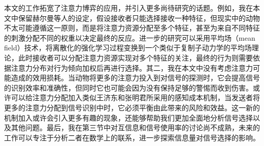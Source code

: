 \documentclass[12pt]{ctexart}  %
\begin{document}
本文的工作拓宽了注意力博弈的应用，并引入更多尚待研究的话题。例如，我在本文中保留赫尔曼等人的设定，假设接收者只能选择接收一种特征，但现实中的动物不太可能遵循这一原则，而是将注意力资源分配至多个特征，甚至为来自不同特征的刺激分配不同的权重以决定最终的反应。进一步的研究可以采用平均场（mean field）技术，将离散化的强化学习过程变换到一个类似于复制子动力学的平均场理论，此时接收者可以分配注意力资源实现对多个特征的关注，最终的行为则需要依据注意力分布对行为倾向加权后再进行选择。\cite{mean_field}其二，我在本文中没有考虑注意力可能造成的效用损耗。当动物将更多的注意力投入到对信号的探测时，它会提高信号的识别效率和准确性，但同时它也可能会因为没有保持足够的警惕而收到伤害。或许可以给注意力分配加入类似王济东和张明君所采用的感知成本机制，当发送者将更多的注意力分配到信号识别中时，它必须平衡由此带来的风险和效益。\cite{Zhang}这一新的机制加入或许会引入更多有趣的现象，还能够帮助我们更加全面地分析信号选择以及其他问题。最后，我在第三节中对互信息和信号使用率的讨论尚不成熟，未来的工作可以专注于分析二者在数学上的联系，进一步探索信息量对信号选择的影响。
\end{document}
